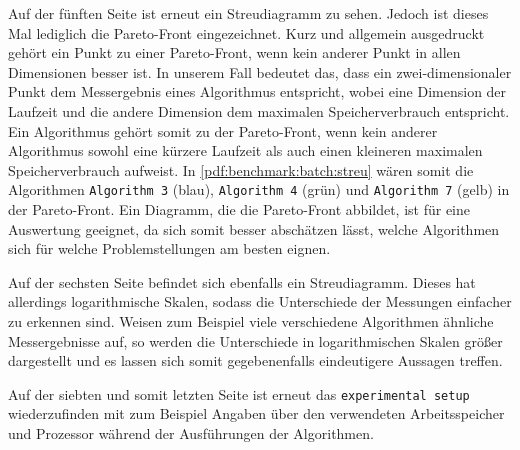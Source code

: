 Auf der fünften Seite ist erneut ein Streudiagramm zu sehen. Jedoch ist dieses Mal lediglich die Pareto-Front eingezeichnet. Kurz und allgemein ausgedruckt gehört ein Punkt zu einer Pareto-Front, wenn kein anderer Punkt in allen Dimensionen \glqq besser\grqq{} ist.
In unserem Fall bedeutet das, dass ein zwei-dimensionaler Punkt dem Messergebnis eines Algorithmus entspricht, wobei eine Dimension der Laufzeit und die andere Dimension dem maximalen Spei\-cher\-ver\-brauch entspricht. Ein Algorithmus gehört somit zu der Pareto-Front, wenn kein anderer Algorithmus sowohl eine kürzere Laufzeit als auch einen kleineren maximalen Spei\-cher\-ver\-brauch aufweist. In \cref{pdf:benchmark:batch:streu} wären somit die Algorithmen \texttt{Algorithm 3} (blau), \texttt{Algorithm 4} (grün) und \texttt{Algorithm 7} (gelb) in der Pareto-Front.
Ein Diagramm, die die Pareto-Front abbildet, ist für eine Auswertung geeignet, da sich somit besser abschätzen lässt, welche Algorithmen sich für welche Problemstellungen am besten eignen.

Auf der sechsten Seite befindet sich ebenfalls ein Streudiagramm. Dieses hat allerdings logarithmische Skalen, sodass die Unterschiede der Messungen einfacher zu erkennen sind. Weisen zum Beispiel viele verschiedene Algorithmen ähnliche Mess\-er\-geb\-nisse auf, so werden die Unterschiede in logarithmischen Skalen größer dargestellt und es lassen sich somit gegebenenfalls eindeutigere Aussagen treffen.

Auf der siebten und somit letzten Seite ist erneut das \texttt{experimental setup} wiederzufinden mit zum Beispiel Angaben über den verwendeten Ar\-beits\-spei\-cher und Prozessor während der Ausführungen der Algorithmen.